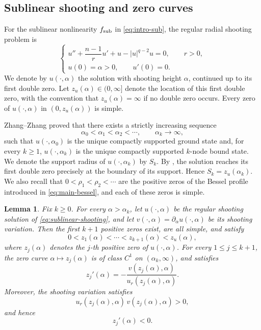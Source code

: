 \documentclass[11pt]{article}
\newtheorem{lemma}[theorem]{Lemma}
\begin{document}
\subsection{Sublinear shooting and zero curves}
For the sublinear nonlinearity $f_{\rm sub}$ in \eqref{eq:intro-sub},
 the regular radial shooting problem is
\begin{equation}
 \begin{cases}
 u''+\dfrac{n-1}{r}u'+u-|u|^{q-2}u=0,\qquad  r>0,\\[4pt]
 u(0)=\alpha>0,\qquad u'(0)=0.
 \end{cases}
 \label{eq:sublinear-shooting}
\end{equation}
We denote by $u(\cdot,\alpha)$ the solution with shooting height $\alpha$,
continued up to its first double zero. Let \(z_u(\alpha)\in(0,\infty]\) denote the location of this first double zero, with the convention that
$z_u(\alpha)=\infty$ if no double zero occurs. Every zero of
$u(\cdot,\alpha)$ in $(0,z_u(\alpha))$ is simple.


Zhang--Zhang \cite[Theorem~1.1]{ZhangZhang} proved that there exists a strictly increasing sequence
\[
 \alpha_0<\alpha_1<\alpha_2<\cdots,\qquad
 \alpha_k\rightarrow\infty,
\]
such that $u(\cdot,\alpha_0)$ is the unique compactly supported ground
state and, for every $k\geq1$, $u(\cdot,\alpha_k)$ is the unique
compactly supported {$k$-node bound state}. We denote the support radius of $u(\cdot,\alpha_k)$ by $S_k$. By
\cite[Remark~2.8]{ZhangZhang}, the solution reaches its first double
zero precisely at the boundary of its support. Hence $S_k=z_u(\alpha_k)$. We also recall that $0<\rho_1<\rho_2<\cdots$ are the positive zeros of
the Bessel profile introduced in \eqref{eq:main-bessel}, and each of these
zeros is simple.

\begin{lemma}
\label{lem:sublinear-zero-curve}
Fix $k\geq0$. For every $\alpha>\alpha_k$, let
$u(\cdot,\alpha)$ be the regular shooting solution of
\eqref{eq:sublinear-shooting}, and let $v(\cdot,\alpha)=\partial_\alpha u(\cdot,\alpha)$ be its shooting variation.
Then the first $k+1$ positive zeros
exist, are all simple, and satisfy
\[
 0<z_1(\alpha)<\cdots<z_{k+1}(\alpha)<z_u(\alpha),
\]
where $z_j(\alpha)$ denotes the $j$-th positive zero of
$u(\cdot,\alpha)$.
For every \(1\leq j\leq k+1\), the zero curve $\alpha\mapsto z_j(\alpha)$ is of class \(C^1\) on \((\alpha_k,\infty)\), and satisfies
\begin{equation}\label{eq:sublinear-zero-derivative-formula}
 z_{j}'(\alpha)
=
 -\frac{v(z_{j}(\alpha),\alpha)}
        {u_r(z_{j}(\alpha),\alpha)}.
\end{equation}
Moreover, the shooting variation satisfies
\begin{equation}
 u_r(z_j(\alpha),\alpha)\,
 v(z_j(\alpha),\alpha)>0,
 \label{eq:sublinear-zero-sign}
\end{equation}
and hence
\begin{equation}
 z_{j}'(\alpha)<0.
 \label{eq:zero-curve-derivative}
\end{equation}
\end{lemma}
\end{document}
